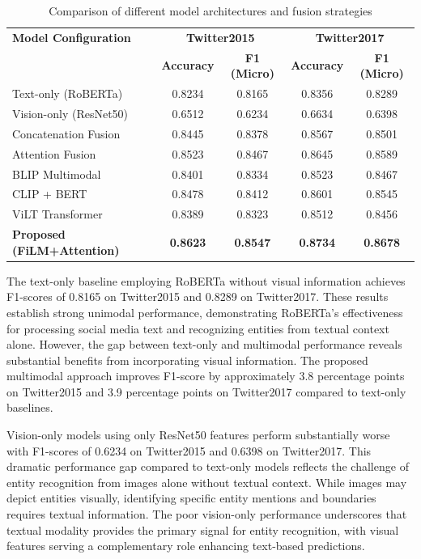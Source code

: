\documentclass[12pt,a4paper]{report}
\begin{document}
\begin{table}[H]
\centering
\caption{Comparison of different model architectures and fusion strategies}
\label{tab:comparison}
\begin{tabular}{lcccc}
\toprule
\textbf{Model Configuration} & \multicolumn{2}{c}{\textbf{Twitter2015}} & \multicolumn{2}{c}{\textbf{Twitter2017}} \\
\cmidrule(lr){2-3} \cmidrule(lr){4-5}
 & \textbf{Accuracy} & \textbf{F1 (Micro)} & \textbf{Accuracy} & \textbf{F1 (Micro)} \\
\midrule
Text-only (RoBERTa) & 0.8234 & 0.8165 & 0.8356 & 0.8289 \\
Vision-only (ResNet50) & 0.6512 & 0.6234 & 0.6634 & 0.6398 \\
Concatenation Fusion & 0.8445 & 0.8378 & 0.8567 & 0.8501 \\
Attention Fusion & 0.8523 & 0.8467 & 0.8645 & 0.8589 \\
BLIP Multimodal & 0.8401 & 0.8334 & 0.8523 & 0.8467 \\
CLIP + BERT & 0.8478 & 0.8412 & 0.8601 & 0.8545 \\
ViLT Transformer & 0.8389 & 0.8323 & 0.8512 & 0.8456 \\
\textbf{Proposed (FiLM+Attention)} & \textbf{0.8623} & \textbf{0.8547} & \textbf{0.8734} & \textbf{0.8678} \\
\bottomrule
\end{tabular}
\end{table}

The text-only baseline employing RoBERTa without visual information achieves F1-scores of 0.8165 on Twitter2015 and 0.8289 on Twitter2017. These results establish strong unimodal performance, demonstrating RoBERTa's effectiveness for processing social media text and recognizing entities from textual context alone. However, the gap between text-only and multimodal performance reveals substantial benefits from incorporating visual information. The proposed multimodal approach improves F1-score by approximately 3.8 percentage points on Twitter2015 and 3.9 percentage points on Twitter2017 compared to text-only baselines.

Vision-only models using only ResNet50 features perform substantially worse with F1-scores of 0.6234 on Twitter2015 and 0.6398 on Twitter2017. This dramatic performance gap compared to text-only models reflects the challenge of entity recognition from images alone without textual context. While images may depict entities visually, identifying specific entity mentions and boundaries requires textual information. The poor vision-only performance underscores that textual modality provides the primary signal for entity recognition, with visual features serving a complementary role enhancing text-based predictions.
\end{document}
